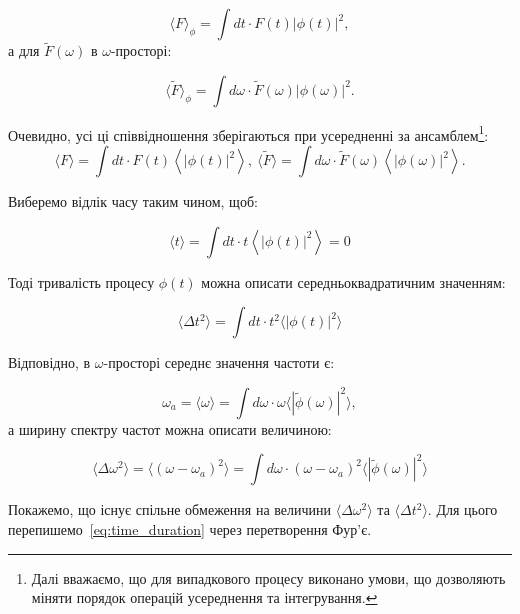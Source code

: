 \begin{equation*}
    \langle F \rangle_{\phi} = \int dt \cdot F(t) |\phi(t)|^2,
\end{equation*}
а для \( \tilde{F}(\omega) \) в \( \omega \)-просторі:

\begin{equation*}
    \langle \tilde{F} \rangle_{\phi} = \int d\omega \cdot \tilde{F}(\omega) |\phi(\omega)|^2.
\end{equation*}

Очевидно, усі ці співвідношення зберігаються при усередненні за ансамблем\footnote{Далі вважаємо, що для випадкового процесу виконано умови, що дозволяють міняти порядок операцій усереднення та інтегрування.}:
\begin{equation*}
    \langle F \rangle = \int dt \cdot F(t) \left\langle|\phi(t)|^2\right\rangle,\ \langle \tilde{F} \rangle = \int d\omega \cdot \tilde{F}(\omega) \left\langle |\phi(\omega)|^2\right\rangle.
\end{equation*}


Виберемо відлік часу таким чином, щоб:

\begin{equation*}
    \langle t \rangle = \int dt \cdot t \left\langle|\phi(t)|^2\right\rangle = 0
\end{equation*}

Тоді тривалість процесу \( \phi(t) \) можна описати середньоквадратичним значенням:

\begin{equation}
    \langle \Delta t^2 \rangle = \int dt \cdot t^2 \langle |\phi(t)|^2 \rangle
    \label{eq:time_duration}
\end{equation}

Відповідно, в \( \omega \)-просторі середнє значення частоти є:

\begin{equation*}
    \omega_a = \langle \omega \rangle = \int d\omega \cdot \omega \langle |\tilde\phi(\omega)|^2 \rangle,
\end{equation*}
а ширину спектру частот можна описати величиною:

\begin{equation}
    \langle \Delta \omega^2 \rangle = \langle (\omega - \omega_a)^2 \rangle = \int d\omega \cdot (\omega - \omega_a)^2 \langle |\tilde\phi(\omega)|^2 \rangle
    \label{eq:frequency_width}
\end{equation}

Покажемо, що існує спільне обмеження на величини $\langle \Delta \omega^2 \rangle$ та $\langle \Delta t^2 \rangle$. Для цього перепишемо~\eqref{eq:time_duration} через перетворення Фур’є.


